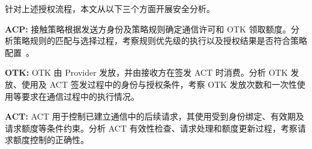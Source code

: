 针对上述授权流程，本文从以下三个方面开展安全分析。

\textbf{ACP:} 接触策略根据发送方身份及策略规则确定通信许可和 OTK 领取额度。分析策略规则的匹配与选择过程，考察规则优先级的执行以及授权结果是否符合策略配置~\cite{syros2025sagaV2,sagaReferenceImpl2026}。

\textbf{OTK:} OTK 由 Provider 发放，并由接收方在签发 ACT 时消费。分析 OTK 发放、使用及 ACT 签发过程中的身份与授权条件，考察 OTK 发放次数和一次性使用等要求在通信过程中的执行情况。

\textbf{ACT:} ACT 用于控制已建立通信中的后续请求，其使用受到身份绑定、有效期及请求额度等条件约束。分析 ACT 有效性检查、请求处理和额度更新过程，考察请求额度控制的正确性。
